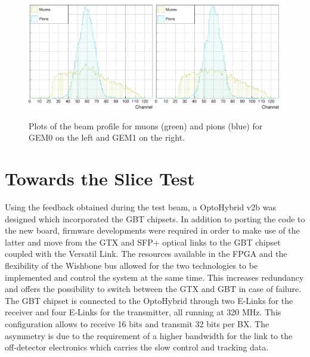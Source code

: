       \begin{figure}[h!]
        \centering
        \includegraphics[width=0.49\textwidth]{img/plots/cBeamProfile_GEM0-crop}
        \includegraphics[width=0.49\textwidth]{img/plots/cBeamProfile_GEM1-crop}
        \caption{Plots of the beam profile for muons (green) and pions (blue) for GEM0 on the left and GEM1 on the right.}
        \label{fig:II-3-data-beam-profile}
      \end{figure}

  \section{Towards the Slice Test}

    Using the feedback obtained during the test beam, a OptoHybrid v2b was designed which incorporated the GBT chipsets. In addition to porting the code to the new board, firmware developments were required in order to make use of the latter and move from the GTX and SFP+ optical links to the GBT chipset coupled with the Versatil Link. The resources available in the FPGA and the flexibility of the Wishbone bus allowed for the two technologies to be implemented and control the system at the same time. This increases redundancy and offers the possibility to switch between the GTX and GBT in case of failure. \\

    The GBT chipset is connected to the OptoHybrid through two E-Links for the receiver and four E-Links for the transmitter, all running at 320 MHz. This configuration allows to receive 16 bits and transmit 32 bits per BX. The asymmetry is due to the requirement of a higher bandwidth for the link to the off-detector electronics which carries the slow control and tracking data. \\

